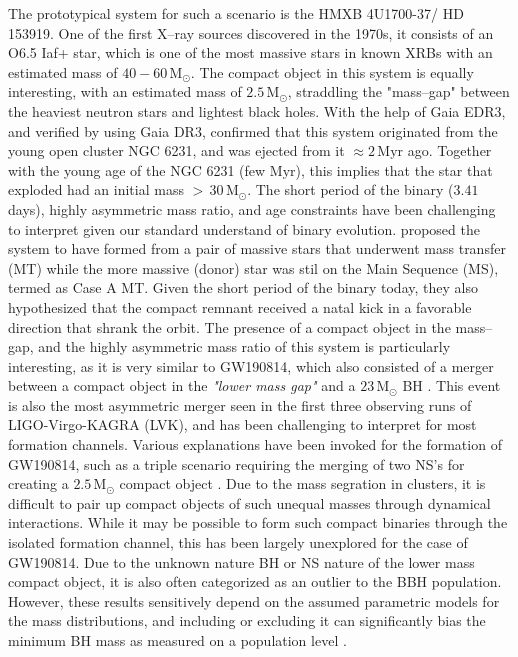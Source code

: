 \documentclass[linenumbers,trackchanges,twocolumn]{aastex701}
\newcommand{\Mdot}{\mathrm{M}_{\odot}}
\newcommand{\Myr}{\mathrm{Myr}}
\begin{document}
The prototypical system for such a scenario is the HMXB 4U1700-37/ HD 153919. One of the first X--ray sources discovered in the 1970s, it consists of an O6.5 Iaf+ star, which is one of the most massive stars in known XRBs with an estimated mass of $40-60\,\Mdot$. The compact object in this system is equally interesting, with an estimated mass of $2.5\,\Mdot$, straddling the "mass--gap" between the heaviest neutron stars and lightest black holes. With the help of Gaia EDR3, and verified by \cite{2022MNRAS.511.4123H} using Gaia DR3, \cite{2021A&A...655A..31V} confirmed that this system originated from the young open cluster NGC 6231, and was ejected from it $\approx 2\,\Myr$ ago. Together with the young age of the NGC 6231 (few $\Myr$), this implies that the star that exploded had an initial mass $>\,30\,\Mdot$. The short period of the binary ($3.41$ days), highly asymmetric mass ratio, and age constraints have been challenging to interpret given our standard understand of binary evolution. \cite{2021A&A...655A..31V} proposed the system to have formed from a pair of massive stars that underwent mass transfer (MT) while the more massive (donor) star was stil on the Main Sequence (MS), termed as Case A MT. Given the short period of the binary today, they also hypothesized that the compact remnant received a natal kick in a favorable direction that shrank the orbit. The presence of a compact object in the mass--gap, and the highly asymmetric mass ratio of this system is particularly interesting, as it is very similar to GW190814, which also consisted of a merger between a compact object in the \textit{"lower mass gap"} and a $23\,\Mdot$ BH \cite{2020ApJ...896L..44A}. This event is also the most asymmetric merger seen in the first three observing runs of LIGO-Virgo-KAGRA (LVK), and has been challenging to interpret for most formation channels. Various explanations have been invoked for the formation of GW190814, such as a triple scenario requiring the merging of two NS's for creating a $2.5\,\Mdot$ compact object \cite{2021MNRAS.500.1817L}. Due to the mass segration in clusters, it is difficult to pair up compact objects of such unequal masses through dynamical interactions. While it may be possible to form such compact binaries through the isolated formation channel, this has been largely unexplored for the case of GW190814. Due to the unknown nature BH or NS nature of the lower mass compact object, it is also often categorized as an outlier to the BBH population. However, these results sensitively depend on the assumed parametric models for the mass distributions, and including or excluding it can significantly bias the minimum BH mass as measured on a population level \cite{2025arXiv250814159C,2021ApJ...913L...7A,2022ApJ...926...34E,2022ApJ...931..108F}. 
\end{document}
